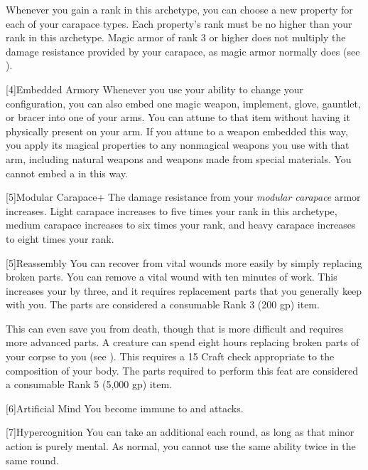       Whenever you gain a rank in this archetype, you can choose a new property for each of your carapace types.
      Each property's rank must be no higher than your rank in this archetype.
      Magic armor of rank 3 or higher does not multiply the damage resistance provided by your carapace, as magic armor normally does (see ).

    [4]{Embedded Armory} Whenever you use your  ability to change your configuration, you can also embed one magic weapon, implement, glove, gauntlet, or bracer into one of your arms.
      You can attune to that item without having it physically present on your arm.
      If you attune to a weapon embedded this way, you apply its magical properties to any nonmagical weapons you use with that arm, including natural weapons and weapons made from special materials.
      You cannot embed a  in this way.

    [5]{Modular Carapace+} The damage resistance from your \textit{modular carapace} armor increases.
      Light carapace increases to five times your rank in this archetype, medium carapace increases to six times your rank, and heavy carapace increases to eight times your rank.

    [5]{Reassembly} You can recover from vital wounds more easily by simply replacing broken parts.
      You can remove a vital wound with ten minutes of work.
      This increases your  by three, and it requires replacement parts that you generally keep with you.
      The parts are considered a consumable Rank 3 (200 gp) item.

      This can even save you from death, though that is more difficult and requires more advanced parts.
      A creature can spend eight hours replacing broken parts of your corpse to  you (see ).
      This requires a  15 Craft check appropriate to the composition of your body.
      The parts required to perform this feat are considered a consumable Rank 5 (5,000 gp) item.

    [6]{Artificial Mind} You become immune to  and  attacks.

    [7]{Hypercognition} You can take an additional  each round, as long as that minor action is purely mental.
      As normal, you cannot use the same ability twice in the same round.

